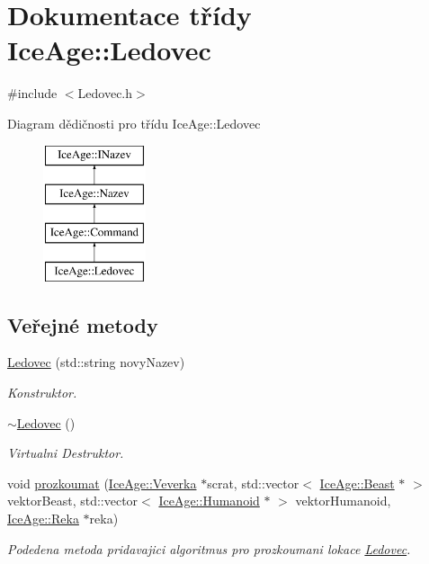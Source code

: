\hypertarget{classIceAge_1_1Ledovec}{}\section{Dokumentace třídy Ice\+Age\+:\+:Ledovec}
\label{classIceAge_1_1Ledovec}


{\ttfamily \#include $<$Ledovec.\+h$>$}

Diagram dědičnosti pro třídu Ice\+Age\+:\+:Ledovec\begin{figure}[H]
\begin{center}
\leavevmode
\includegraphics[height=4.000000cm]{db/d1e/classIceAge_1_1Ledovec}
\end{center}
\end{figure}
\subsection*{Veřejné metody}
\begin{DoxyCompactItemize}
\item 
\hyperlink{classIceAge_1_1Ledovec_adb1cb86de12b9d72888202bef00ae962}{Ledovec} (std\+::string novy\+Nazev)
\begin{DoxyCompactList}\small\item\em Konstruktor. \end{DoxyCompactList}\item 
\hyperlink{classIceAge_1_1Ledovec_a7533fa470c0ab65a05c03a0de2b1ba5e}{$\sim$\+Ledovec} ()
\begin{DoxyCompactList}\small\item\em Virtualni Destruktor. \end{DoxyCompactList}\item 
void \hyperlink{classIceAge_1_1Ledovec_a92538e91b889749c03de931e77da8753}{prozkoumat} (\hyperlink{classIceAge_1_1Veverka}{Ice\+Age\+::\+Veverka} $\ast$scrat, std\+::vector$<$ \hyperlink{classIceAge_1_1Beast}{Ice\+Age\+::\+Beast} $\ast$ $>$ vektor\+Beast, std\+::vector$<$ \hyperlink{classIceAge_1_1Humanoid}{Ice\+Age\+::\+Humanoid} $\ast$ $>$ vektor\+Humanoid, \hyperlink{classIceAge_1_1Reka}{Ice\+Age\+::\+Reka} $\ast$reka)
\begin{DoxyCompactList}\small\item\em Podedena metoda pridavajici algoritmus pro prozkoumani lokace \hyperlink{classIceAge_1_1Ledovec}{Ledovec}. \end{DoxyCompactList}\end{DoxyCompactItemize}
